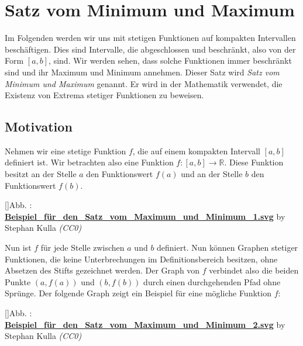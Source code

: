 \documentclass[fontsize=9pt,
               parskip=half-,
               DIV=14,
               listof=chapterentry,
               tocflat]{scrbook}
\newcounter{imagelabel}
\begin{document}
\chapter{Satz vom Minimum und Maximum}

Im Folgenden werden wir uns mit stetigen Funktionen auf kompakten Intervallen beschäftigen. Dies sind Intervalle, die abgeschlossen und beschränkt, also von der Form $[a,b]$, sind. Wir werden sehen, dass solche Funktionen immer beschränkt sind und ihr Maximum und Minimum annehmen. Dieser Satz wird \emph{Satz vom Minimum und Maximum} genannt. Er wird in der Mathematik verwendet, die Existenz von Extrema stetiger Funktionen zu beweisen.

\section{Motivation}

Nehmen wir eine stetige Funktion $f$, die auf einem kompakten Intervall $[a,b]$ definiert ist. Wir betrachten also eine Funktion $f:[a,b]\to \mathbb {R} $. Diese Funktion besitzt an der Stelle $a$ den Funktionswert $f(a)$ und an der Stelle $b$ den Funktionswert $f(b)$.

[]{Abb. : \protect\href{https://commons.wikimedia.org/wiki/File:Beispiel_für_den_Satz_vom_Maximum_und_Minimum_1.svg}{\textbf{Beispiel\allowbreak\_für\allowbreak\_den\allowbreak\_Satz\allowbreak\_vom\allowbreak\_Maximum\allowbreak\_und\allowbreak\_Minimum\allowbreak\_1.svg}} by Stephan Kulla \textit{(CC0)}}\begin{center}
\end{center}

Nun ist $f$ für jede Stelle zwischen $a$ und $b$ definiert. Nun können Graphen stetiger Funktionen, die keine Unterbrechungen im Definitionsbereich besitzen, ohne Absetzen des Stifts gezeichnet werden. Der Graph von $f$ verbindet also die beiden Punkte $(a,f(a))$ und $(b,f(b))$ durch einen durchgehenden Pfad ohne Sprünge. Der folgende Graph zeigt ein Beispiel für eine mögliche Funktion $f$:

[]{Abb. : \protect\href{https://commons.wikimedia.org/wiki/File:Beispiel_für_den_Satz_vom_Maximum_und_Minimum_2.svg}{\textbf{Beispiel\allowbreak\_für\allowbreak\_den\allowbreak\_Satz\allowbreak\_vom\allowbreak\_Maximum\allowbreak\_und\allowbreak\_Minimum\allowbreak\_2.svg}} by Stephan Kulla \textit{(CC0)}}\begin{center}
\end{center}
\end{document}
